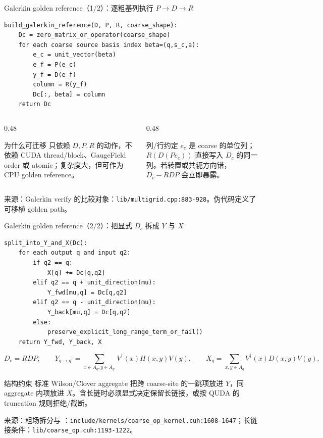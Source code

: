 \documentclass[UTF8,aspectratio=169,11pt]{ctexbeamer}
\newcommand{\source}[1]{\vspace{0.05em}\par{\raggedright\scriptsize\color{muted}来源：#1\par}}
\newcommand{\codepath}[1]{\nolinkurl{#1}}
\begin{document}
\begin{frame}[fragile,t]{Galerkin golden reference（1/2）：逐粗基列执行 \(P\to D\to R\)}
  \begin{lstlisting}[firstnumber=1]
build_galerkin_reference(D, P, R, coarse_shape):
    Dc = zero_matrix_or_operator(coarse_shape)
    for each coarse source basis index beta=(q,s_c,a):
        e_c = unit_vector(beta)
        e_f = P(e_c)
        y_f = D(e_f)
        column = R(y_f)
        Dc[:, beta] = column
    return Dc
  \end{lstlisting}
  \vspace{0.10cm}
  \begin{columns}[T,totalwidth=\textwidth]
    \begin{column}{0.48\textwidth}
      \begin{block}{为什么可迁移}
        只依赖 \(D,P,R\) 的动作，不依赖 CUDA thread/block、GaugeField order 或 atomic；复杂度大，但可作为 CPU golden reference。
      \end{block}
    \end{column}
    \begin{column}{0.48\textwidth}
      \begin{alertblock}{列/行约定}
        \(e_c\) 是 coarse 的单位列；\(R(D(Pe_c))\) 直接写入 \(D_c\) 的同一列。若转置或共轭方向错，\(D_c-RDP\) 会立即暴露。
      \end{alertblock}
    \end{column}
  \end{columns}
  \source{Galerkin verify 的比较对象：\codepath{lib/multigrid.cpp:883-928}。伪代码定义了可移植 golden path。}
\end{frame}

\begin{frame}[fragile,t]{Galerkin golden reference（2/2）：把显式 \(D_c\) 拆成 \(Y\) 与 \(X\)}
  \begin{lstlisting}[firstnumber=1]
split_into_Y_and_X(Dc):
    for each output q and input q2:
        if q2 == q:
            X[q] += Dc[q,q2]
        elif q2 == q + unit_direction(mu):
            Y_fwd[mu,q] = Dc[q,q2]
        elif q2 == q - unit_direction(mu):
            Y_back[mu,q] = Dc[q,q2]
        else:
            preserve_explicit_long_range_term_or_fail()
    return Y_fwd, Y_back, X
  \end{lstlisting}
  \vspace{0.10cm}
  \begin{equation*}
    D_c=RDP,\qquad
    Y_{q\to q'}=\sum_{x\in A_q,y\in A_{q'}}V^\dagger(x)H(x,y)V(y),
    \qquad
    X_q=\sum_{x,y\in A_q}V^\dagger(x)D(x,y)V(y).
  \end{equation*}
  \begin{alertblock}{结构约束}
    标准 Wilson/Clover aggregate 把跨 coarse-site 的一跳项放进 \(Y\)，同 aggregate 内项放进 \(X\)。含长链时必须显式决定保留长链接，或按 QUDA 的 truncation 规则拒绝/截断。
  \end{alertblock}
  \source{粗场拆分与 \texttt{}：\codepath{include/kernels/coarse_op_kernel.cuh:1608-1647}；长链接条件：\codepath{lib/coarse_op.cuh:1193-1222}。}
\end{frame}
\end{document}
